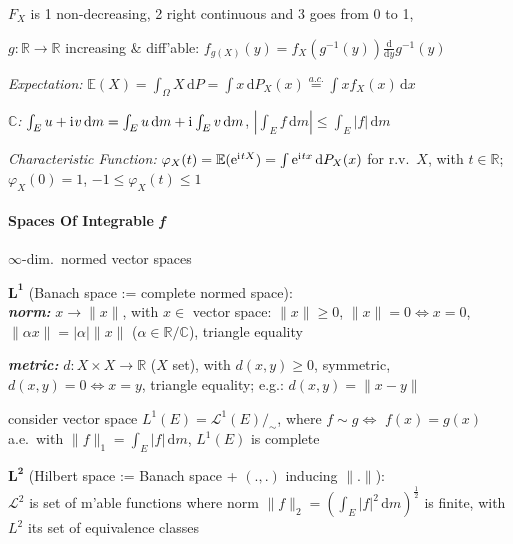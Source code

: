 \documentclass[8pt,twoside]{extarticle}
\newcommand{\compi}{\mathrm{i}\mkern1mu}
\begin{document}
\begin{multicols}{2}
$F_X$ is 1 non-decreasing, 2 right continuous and 3 goes from 0 to 1,



$g:\mathbb{R}\to\mathbb{R}$ increasing  \& diff'able: $f_{g(X)}(y){=}f_X(g^{-1}(y))\frac{\mathrm{d}}{\mathrm{d}y}g^{-1}(y)$

\textit{Expectation:} $\mathbb{E}(X)=\int_{\Omega}X\,\mathrm{d}P
=\int x\,\mathrm{d}P_X(x)
\overset{a.c.}{=}\int xf_X(x)\,\mathrm{d}x$

\textit{$\mathbb{C}$:} $\int_E u+\compi v \,\mathrm{d}m = \int_E u \,\mathrm{d}m  + \compi \int_E v \,\mathrm{d}m $, $|\int_E f \,\mathrm{d}m| \leq \int_E |f| \,\mathrm{d}m$

\textit{Characteristic Function:} $\varphi_X(t)=\mathbb{E}(\mathrm{e}^{\compi tX}) = \int \mathrm{e}^{\compi tx} \, \mathrm{d}P_X(x)$ for r.v.\ $X$, with $t\in \mathbb{R}$;
$\varphi_X(0)=1$, $-1\leq\varphi_X(t)\leq 1$


\paragraph{Spaces Of Integrable \textit{f}} $\infty$-dim.\ normed vector spaces 





\textbf{$\boldsymbol{L^1}$} (Banach space := complete normed space): \\ 

\textbf{\textit{norm:}} $x\to \|x\|$, with $x\in$ vector space: $\| x\|\geq 0$, $\| x\|=0 \Leftrightarrow x=0$, $\|\alpha x\| =|\alpha| \| x\|$ ($\alpha\in\mathbb{R}/\mathbb{C}$), triangle equality

\textbf{\textit{metric:}}  $d:X\times X \to \mathbb{R}$ ($X$ set), with $d(x,y)\geq 0$, symmetric, $d(x,y){=}0 \Leftrightarrow x{=}y$, triangle equality; e.g.: $d(x,y)=\|x{-}y\|$

consider vector space $L^1(E) = \mathcal{L}^1(E)/_\sim$, where $f\sim g \Leftrightarrow $ $ f(x)=g(x)$ a.e.\ with $\|f\|_1=\int_E|f|\,\mathrm{d}m$, $L^1(E)$ is complete

\textbf{$\boldsymbol{L^2}$ }(Hilbert space := Banach space + $(.,.)$ inducing $\|.\|$): \\ $\mathcal{L}^2$ is set of m'able functions where norm $\|f\|_2=\left(\int_E|f|^2\,\mathrm{d}m\right)^{\frac{1}{2}}$ is finite, with $L^2$ its set of equivalence classes


\end{multicols}
\end{document}
